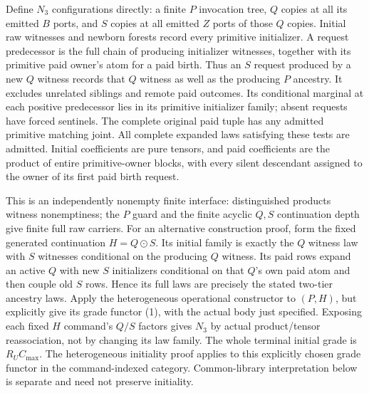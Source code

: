 \documentclass[11pt]{article}\usepackage{amsmath,amssymb,amsthm,geometry}\geometry{margin=1in}\newtheorem{theorem}{Theorem}
\begin{document}
Define $N_3$ configurations directly: a finite $P$ invocation tree, $Q$ copies at all its emitted $B$ ports, and $S$ copies at all emitted $Z$ ports of those $Q$ copies. Initial raw witnesses and newborn forests record every primitive initializer. A request predecessor is the full chain of producing initializer witnesses, together with its primitive paid owner's atom for a paid birth. Thus an $S$ request produced by a new $Q$ witness records that $Q$ witness as well as the producing $P$ ancestry. It excludes unrelated siblings and remote paid outcomes. Its conditional marginal at each positive predecessor lies in its primitive initializer family; absent requests have forced sentinels. The complete original paid tuple has any admitted primitive matching joint. All complete expanded laws satisfying these tests are admitted. Initial coefficients are pure tensors, and paid coefficients are the product of entire primitive-owner blocks, with every silent descendant assigned to the owner of its first paid birth request.

This is an independently nonempty finite interface: distinguished products witness nonemptiness; the $P$ guard and the finite acyclic $Q,S$ continuation depth give finite full raw carriers. For an alternative construction proof, form the fixed generated continuation $H=Q\odot S$. Its initial family is exactly the $Q$ witness law with $S$ witnesses conditional on the producing $Q$ witness. Its paid rows expand an active $Q$ with new $S$ initializers conditional on that $Q$'s own paid atom and then couple old $S$ rows. Hence its full laws are precisely the stated two-tier ancestry laws. Apply the heterogeneous operational constructor to $(P,H)$, but explicitly give its grade functor (1), with the actual body just specified. Exposing each fixed $H$ command's $Q/S$ factors gives $N_3$ by actual product/tensor reassociation, not by changing its law family. The whole terminal initial grade is $R_UC_{\max}$. The heterogeneous initiality proof applies to this explicitly chosen grade functor in the command-indexed category. Common-library interpretation below is separate and need not preserve initiality.
\end{document}
